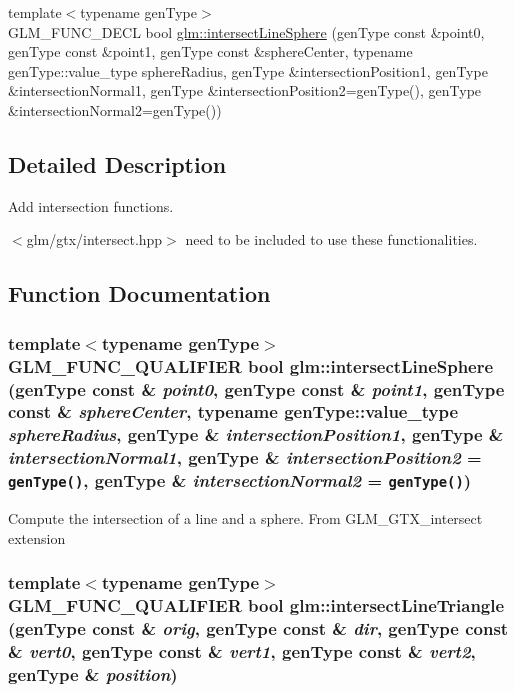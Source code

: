 \begin{CompactItemize}
\item 
{\footnotesize template$<$typename genType$>$ }\\GLM\_\-FUNC\_\-DECL bool \hyperlink{group__gtx__intersect_g28b9b80acf2ea35780709e01b27ab60f}{glm::intersectLineSphere} (genType const \&point0, genType const \&point1, genType const \&sphereCenter, typename genType::value\_\-type sphereRadius, genType \&intersectionPosition1, genType \&intersectionNormal1, genType \&intersectionPosition2=genType(), genType \&intersectionNormal2=genType())
\end{CompactItemize}


\subsection{Detailed Description}
Add intersection functions. 

$<$glm/gtx/intersect.hpp$>$ need to be included to use these functionalities. 

\subsection{Function Documentation}
\hypertarget{group__gtx__intersect_g28b9b80acf2ea35780709e01b27ab60f}{
\subsubsection[intersectLineSphere]{\setlength{\rightskip}{0pt plus 5cm}template$<$typename genType$>$ GLM\_\-FUNC\_\-QUALIFIER bool glm::intersectLineSphere (genType const \& {\em point0}, \/  genType const \& {\em point1}, \/  genType const \& {\em sphereCenter}, \/  typename genType::value\_\-type {\em sphereRadius}, \/  genType \& {\em intersectionPosition1}, \/  genType \& {\em intersectionNormal1}, \/  genType \& {\em intersectionPosition2} = {\tt genType()}, \/  genType \& {\em intersectionNormal2} = {\tt genType()})}}
\label{group__gtx__intersect_g28b9b80acf2ea35780709e01b27ab60f}


Compute the intersection of a line and a sphere. From GLM\_\-GTX\_\-intersect extension \hypertarget{group__gtx__intersect_g1aa5d241478d1493ff4d8c22b8d9e293}{
\subsubsection[intersectLineTriangle]{\setlength{\rightskip}{0pt plus 5cm}template$<$typename genType$>$ GLM\_\-FUNC\_\-QUALIFIER bool glm::intersectLineTriangle (genType const \& {\em orig}, \/  genType const \& {\em dir}, \/  genType const \& {\em vert0}, \/  genType const \& {\em vert1}, \/  genType const \& {\em vert2}, \/  genType \& {\em position})}}
\label{group__gtx__intersect_g1aa5d241478d1493ff4d8c22b8d9e293}


